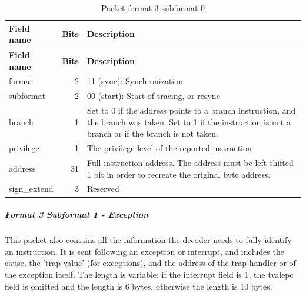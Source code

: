 \documentclass[main\_\_EN.tex]{subfiles}
\begin{document}
\begin{longtable}[c]{ |l|r|L{10cm}| }
    \caption{Packet format 3 subformat 0}
    \label{tab:f3s0}
    \\\hline{}
    \textbf{Field name} & \textbf{Bits} & \textbf{Description} \\\hline
    \endfirsthead
    \textbf{Field name} & \textbf{Bits} & \textbf{Description} \\\hline
    \endhead
    \endfoot
    \endlastfoot

    format & 2 & 11 (sync): Synchronization \\\hline
    subformat & 2 & 00 (start): Start of tracing, or resync \\\hline
    branch & 1 & Set to 0 if the address points to a branch instruction, and the branch was taken. Set to 1 if the instruction is not a branch or if the branch is not taken. \\\hline
    privilege & 1 & The privilege level of the reported instruction \\\hline
    address & 31 & Full instruction address. The address must be left shifted 1 bit in order to recreate the original byte address. \\\hline
    sign\_extend & 3 & Reserved \\\hline
 \end{longtable}

\subparagraph{Format 3 Subformat 1 - Exception}
This packet also contains all the information the decoder needs to fully identify an instruction. It
is sent following an exception or interrupt, and includes the cause, the 'trap value' (for exceptions),
and the address of the trap handler or of the exception itself. The length is variable: if the interrupt field is 1, the tvalepc field is omitted and the length is 6 bytes, otherwise the length is 10 bytes.
\end{document}
